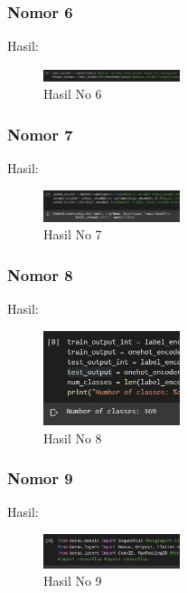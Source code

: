 \subsubsection{Nomor 6}
\hfill\break

Hasil:
\begin{figure}[H]
\centering
	\includegraphics[width=4cm]{figures/1174057/chapter7/no6.jpg}
	\caption{Hasil No 6}
\end{figure}

\subsubsection{Nomor 7}
\hfill\break

Hasil:
\begin{figure}[H]
\centering
	\includegraphics[width=4cm]{figures/1174057/chapter7/no7.jpg}
	\caption{Hasil No 7}
\end{figure}

\subsubsection{Nomor 8}
\hfill\break

Hasil:
\begin{figure}[H]
\centering
	\includegraphics[width=4cm]{figures/1174057/chapter7/no8.jpg}
	\caption{Hasil No 8}
\end{figure}

\subsubsection{Nomor 9}
\hfill\break

Hasil:
\begin{figure}[H]
\centering
	\includegraphics[width=4cm]{figures/1174057/chapter7/no9.jpg}
	\caption{Hasil No 9}
\end{figure}


